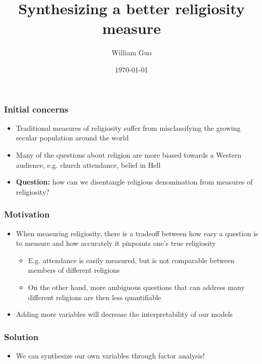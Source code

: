 \documentclass{beamer}
\title[Data mining religiosity measurements]{Synthesizing a better religiosity measure} %
\author{William Guo} %
\institute{ Rice University }
\date{\today} %
\begin{document}
\begin{frame}
	\titlepage %
\end{frame}


\begin{frame}
\frametitle{Initial concerns}
\begin{itemize}
	\item Traditional measures of religiosity suffer from misclassifying the growing secular population around the world
	\item Many of the questions about religion are more biased towards a Western audience, e.g. church attendance, belief in Hell
	\item \textbf{Question:} how can we disentangle religious denomination from measures of religiosity? 
\end{itemize}
\end{frame}


\begin{frame}
\frametitle{Motivation}
\begin{itemize}
	\item When measuring religiosity, there is a tradeoff between how easy a question is to measure and how accurately it pinpoints one's true religiosity
	\begin{itemize}
		\item E.g. attendance is easily measured, but is not comparable between members of different religions
		\item On the other hand, more ambiguous questions that can address many different religions are then less quantifiable
	\end{itemize}
	\item Adding more variables will decrease the interpretability of our models
\end{itemize}
\end{frame}


\begin{frame}
	\frametitle{Solution}
	\begin{itemize}
		\item \large We can synthesize our own variables through factor analysis!
	\end{itemize}
\end{frame}
\end{document}
